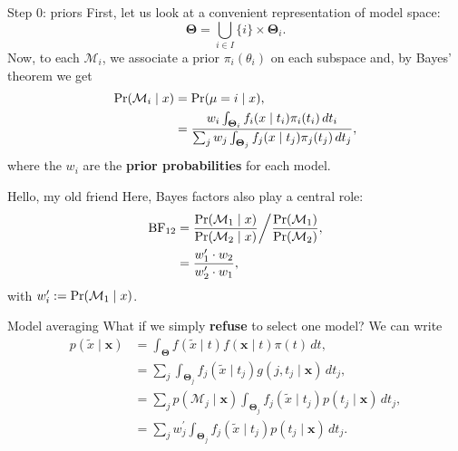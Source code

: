 \begin{frame}{Step 0: priors}
First, let us look at a convenient representation of model space:
\begin{equation*}
 \boldsymbol{\Theta} = \bigcup_{i \in I} \{i\} \times \boldsymbol{\Theta}_i.
\end{equation*}
Now, to each $\mathcal{M}_i$, we associate a prior $\pi_i(\theta_i)$  on each subspace and, by Bayes' theorem we get
\begin{align*}
 \operatorname{Pr}(\mathcal{M}_i \mid x) & = \operatorname{Pr}( \mu = i \mid x), \\ 
 &= \frac{w_i \int_{\boldsymbol{\Theta}_i} f_i(x\mid t_i)\pi_i(t_i)\,dt_i}{\sum_{j} w_j \int_{\boldsymbol{\Theta}_j} f_j(x\mid t_j)\pi_j(t_j)\,dt_j },
\end{align*}
where the $w_i$ are the \textbf{prior probabilities} for each model.
\end{frame}
\begin{frame}{Hello, my old friend}
Here, Bayes factors also play a central role:
\begin{align*}
 \operatorname{BF}_{12} &= \frac{\operatorname{Pr}(\mathcal{M}_1 \mid x)}{\operatorname{Pr}(\mathcal{M}_2 \mid x)}\bigg/\frac{\operatorname{Pr}(\mathcal{M}_1)}{\operatorname{Pr}(\mathcal{M}_2)},\\
  &= \frac{w_1^\prime \cdot w_2}{w_2^\prime \cdot w_1},
\end{align*}
with $w_i^\prime := \operatorname{Pr}(\mathcal{M}_1 \mid x)$.
\end{frame}
\begin{frame}{Model averaging}
What if we simply \textbf{refuse} to select one model?
We can write
\begin{align}
 \nonumber
 p(\tilde{x} \mid \boldsymbol{x})  &= \int_{\boldsymbol{\Theta}} f(\tilde{x} \mid t) f(\boldsymbol{x}\mid t)\pi(t)\,dt,\\
 \nonumber
 &= \sum_{j} \int_{\boldsymbol{\Theta}_j} f_j(\tilde{x} \mid t_j) g(j, t_j \mid \boldsymbol{x})\,dt_j,\\
 \nonumber
 &= \sum_j p (\mathcal{M}_j \mid \boldsymbol{x}) \int_{\boldsymbol{\Theta}_j} f_j(\tilde{x} \mid t_j) p(t_j \mid \boldsymbol{x})\,dt_j,\\
 \label{eq:predictive_2}
  &= \sum_j w_j^\prime \int_{\boldsymbol{\Theta}_j} f_j(\tilde{x} \mid t_j) p(t_j \mid \boldsymbol{x})\,dt_j.
\end{align}
\end{frame}
